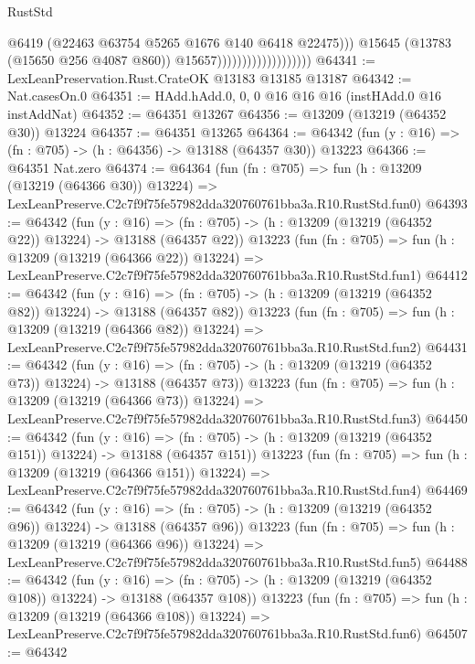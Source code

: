 \begin{lexlean}{RustStd}
\begin{coremodule}
                                              @6419
                                              (@22463 @63754 @5265 @1676 @140 @6418 @22475)))
                                          @15645
                                          (@13783 (@15650 @256 @4087 @860))
                                          @15657)))))))))))))))))))
@64341 := LexLeanPreservation.Rust.CrateOK @13183 @13185 @13187
@64342 := Nat.casesOn.{0}
@64351 := HAdd.hAdd.{0, 0, 0} @16 @16 @16 (instHAdd.{0} @16 instAddNat)
@64352 := @64351 @13267
@64356 := @13209 (@13219 (@64352 @30)) @13224
@64357 := @64351 @13265
@64364 := @64342 (fun (y : @16) => (fn : @705) -> (h : @64356) -> @13188 (@64357 @30)) @13223
@64366 := @64351 Nat.zero
@64374 := @64364
    (fun (fn : @705) =>
    fun (h : @13209 (@13219 (@64366 @30)) @13224) =>
    LexLeanPreserve.C2c7f9f75fe57982dda320760761bba3a.R10.RustStd.fun0)
@64393 := @64342
    (fun (y : @16) =>
    (fn : @705) -> (h : @13209 (@13219 (@64352 @22)) @13224) -> @13188 (@64357 @22))
    @13223
    (fun (fn : @705) =>
    fun (h : @13209 (@13219 (@64366 @22)) @13224) =>
    LexLeanPreserve.C2c7f9f75fe57982dda320760761bba3a.R10.RustStd.fun1)
@64412 := @64342
    (fun (y : @16) =>
    (fn : @705) -> (h : @13209 (@13219 (@64352 @82)) @13224) -> @13188 (@64357 @82))
    @13223
    (fun (fn : @705) =>
    fun (h : @13209 (@13219 (@64366 @82)) @13224) =>
    LexLeanPreserve.C2c7f9f75fe57982dda320760761bba3a.R10.RustStd.fun2)
@64431 := @64342
    (fun (y : @16) =>
    (fn : @705) -> (h : @13209 (@13219 (@64352 @73)) @13224) -> @13188 (@64357 @73))
    @13223
    (fun (fn : @705) =>
    fun (h : @13209 (@13219 (@64366 @73)) @13224) =>
    LexLeanPreserve.C2c7f9f75fe57982dda320760761bba3a.R10.RustStd.fun3)
@64450 := @64342
    (fun (y : @16) =>
    (fn : @705) -> (h : @13209 (@13219 (@64352 @151)) @13224) -> @13188 (@64357 @151))
    @13223
    (fun (fn : @705) =>
    fun (h : @13209 (@13219 (@64366 @151)) @13224) =>
    LexLeanPreserve.C2c7f9f75fe57982dda320760761bba3a.R10.RustStd.fun4)
@64469 := @64342
    (fun (y : @16) =>
    (fn : @705) -> (h : @13209 (@13219 (@64352 @96)) @13224) -> @13188 (@64357 @96))
    @13223
    (fun (fn : @705) =>
    fun (h : @13209 (@13219 (@64366 @96)) @13224) =>
    LexLeanPreserve.C2c7f9f75fe57982dda320760761bba3a.R10.RustStd.fun5)
@64488 := @64342
    (fun (y : @16) =>
    (fn : @705) -> (h : @13209 (@13219 (@64352 @108)) @13224) -> @13188 (@64357 @108))
    @13223
    (fun (fn : @705) =>
    fun (h : @13209 (@13219 (@64366 @108)) @13224) =>
    LexLeanPreserve.C2c7f9f75fe57982dda320760761bba3a.R10.RustStd.fun6)
@64507 := @64342

\end{coremodule}
\end{lexlean}
